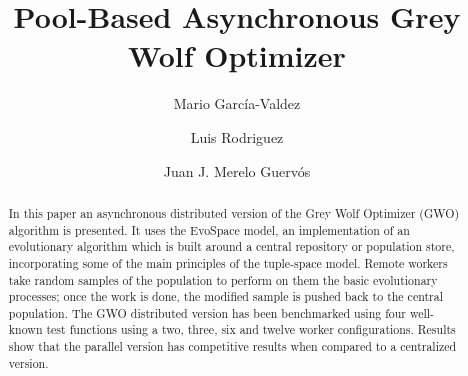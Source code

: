 \documentclass{llncs}
\begin{document}
\sloppy

\title{Pool-Based Asynchronous Grey Wolf Optimizer}

\author{Mario Garc\'ia-Valdez \and Luis Rodriguez \and Juan J. Merelo Guerv\'os}


\maketitle

\begin{abstract}
 

In this paper an asynchronous distributed version of 
    the Grey Wolf Optimizer (GWO) algorithm is presented. It uses the
    EvoSpace model, an implementation of an evolutionary algorithm which is
    built around a central repository or population store, incorporating some of 
    the main principles of the tuple-space model. Remote workers
	take random samples of the population to perform on them the basic evolutionary
	processes; once the work is done, the modified sample is pushed back to the 
	central population. The GWO distributed version has been benchmarked using 
	four well-known test functions using a two, three, six and twelve worker configurations. 
	Results show that the parallel version has competitive results when compared 
	to a centralized version. 
	

\end{abstract}
\end{document}
